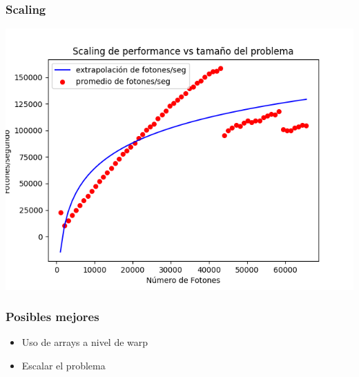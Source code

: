 \documentclass{beamer}
\begin{document}
\begin{frame}
    \frametitle{Scaling}
    \includegraphics[width=\textwidth]{imagenes/scaling_gpu.png}
\end{frame}

\begin{frame}
    \frametitle{Posibles mejores}
    \begin{itemize}
        \item Uso de arrays a nivel de warp
        \item Escalar el problema
    \end{itemize}
\end{frame}
\end{document}
